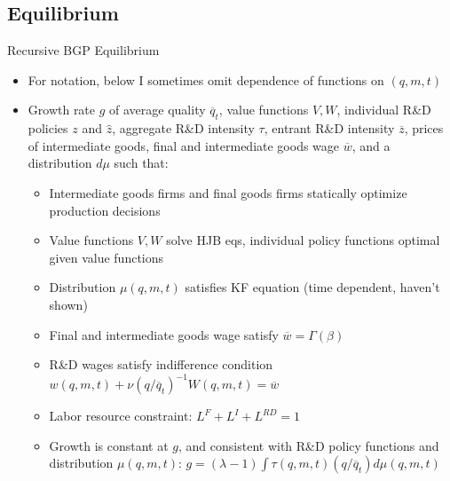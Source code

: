 \documentclass[english,usenames,dvipsnames]{beamer}
\begin{document}
\subsection{Equilibrium}
\begin{frame}{Recursive BGP Equilibrium}
\begin{itemize}
	\footnotesize
	\item For notation, below I sometimes omit dependence of functions on $(q,m,t)$
	\item Growth rate $g$ of average quality $\overline{q}_t$, value functions $V,W$, individual R\&D policies $z$ and $\hat{z}$, aggregate R\&D intensity $\tau$, entrant R\&D intensity $\overline{z}$, prices of intermediate goods, final and intermediate goods wage $\overline{w}$, and a distribution $d\mu$ such that: 
	\begin{itemize}
		\footnotesize
		\item Intermediate goods firms and final goods firms statically optimize production decisions
		\item Value functions $V,W$ solve HJB eqs, individual policy functions optimal given value functions
		\item Distribution $\mu(q,m,t)$ satisfies KF equation (time dependent, haven't shown)
		\item Final and intermediate goods wage satisfy $\overline{w} = \Gamma(\beta)$
		\item R\&D wages satisfy indifference condition $w(q,m,t) + \nu (q/\overline{q}_t)^{-1} W(q,m,t) = \overline{w}$
		\item Labor resource constraint: $L^F + L^I + L^{RD} = 1$
		\item Growth is constant at $g$, and consistent with R\&D policy functions and distribution $\mu(q,m,t)$: $g = (\lambda -1) \int \tau(q,m,t) (q/\overline{q}_t) d\mu(q,m,t)$
	\end{itemize} 
\end{itemize}
\end{frame}
\end{document}
